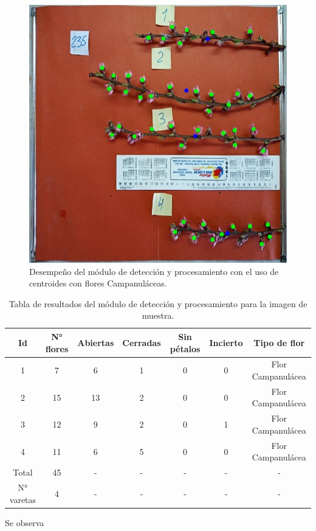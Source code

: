 \begin{figure}[ht]
	\centering
	\includegraphics[scale=0.5]{./Figures/centroids3.jpeg}
	\caption{Desempeño del módulo de detección y procesamiento con el uso de centroides con flores Campanuláceas.}
	\label{fig:DesempeñoMod2}
\end{figure}

\begin{table}[h]
	\centering
	\caption{Tabla de resultados del módulo de detección y procesamiento para la imagen de muestra.}
	\begin{tabular}{c c c c c c c}    
		\toprule
		\textbf{Id}&\textbf{N° flores}&\textbf{Abiertas}&\textbf{Cerradas}&\textbf{Sin pétalos}&\textbf{Incierto} &\textbf{Tipo de flor}\\
		\midrule
		1 & 7 & 6 & 1 & 0 & 0 & Flor Campanulácea\\
		2 & 15 & 13 & 2 & 0 & 0 & Flor Campanulácea\\
		3 & 12 & 9 & 2 & 0 & 1 & Flor Campanulácea\\
		4 & 11 & 6 & 5 & 0 & 0 & Flor Campanulácea\\
		Total & 45 & - & - & - & - & - \\
		N° varetas & 4 & - & - & - & - & - \\
		\bottomrule
		\hline
	\end{tabular}
	\label{tab:resultadosFasterConAug}
\end{table}
\newpage

Se observa 